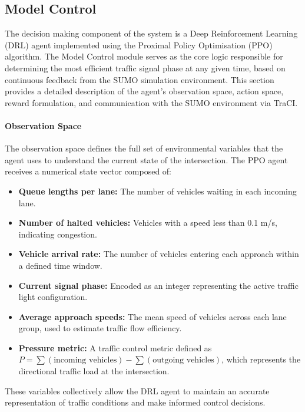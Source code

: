 ﻿\documentclass[11pt, a4paper]{report}
\begin{document}
\subsection{Model Control}

The decision making component of the system is a Deep Reinforcement Learning (DRL) agent implemented using the Proximal Policy Optimisation (PPO) algorithm. The Model Control module serves as the core logic responsible for determining the most efficient traffic signal phase at any given time, based on continuous feedback from the SUMO simulation environment. This section provides a detailed description of the agent's observation space, action space, reward formulation, and communication with the SUMO environment via TraCI.

\paragraph{Observation Space}

The observation space defines the full set of environmental variables that the agent uses to understand the current state of the intersection. The PPO agent receives a numerical state vector composed of:

\begin{itemize}
    \item \textbf{Queue lengths per lane:} The number of vehicles waiting in each incoming lane.
    \item \textbf{Number of halted vehicles:} Vehicles with a speed less than 0.1 m/s, indicating congestion.
    \item \textbf{Vehicle arrival rate:} The number of vehicles entering each approach within a defined time window.
    \item \textbf{Current signal phase:} Encoded as an integer representing the active traffic light configuration.
    \item \textbf{Average approach speeds:} The mean speed of vehicles across each lane group, used to estimate traffic flow efficiency.
    \item \textbf{Pressure metric:} A traffic control metric defined as $P = \sum(\text{incoming vehicles}) - \sum(\text{outgoing vehicles})$, which represents the directional traffic load at the intersection.
\end{itemize}

These variables collectively allow the DRL agent to maintain an accurate representation of traffic conditions and make informed control decisions.
\end{document}
